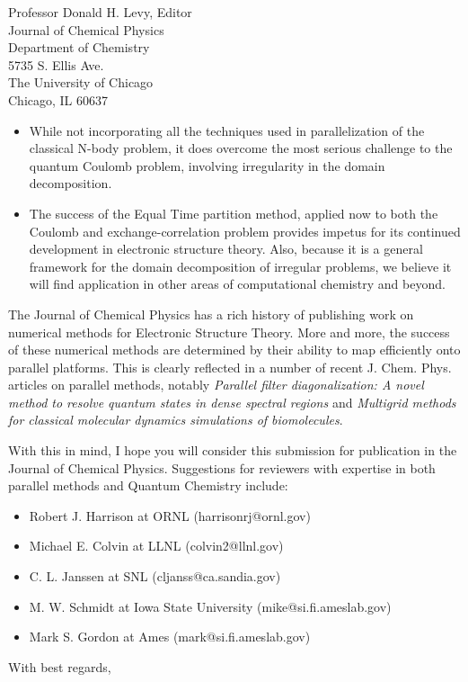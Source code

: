 \begin{letter}{
Professor Donald H. Levy, Editor\\
Journal of Chemical Physics\\
Department of Chemistry\\
5735 S. Ellis Ave.\\
The University of Chicago\\
Chicago, IL 60637}
\begin{itemize}
\item  While not incorporating all the techniques used in parallelization
       of the classical N-body problem, it does overcome the most
       serious challenge to the quantum Coulomb problem, involving 
       irregularity in the domain decomposition. 
  
\item  The success of the Equal Time partition method, applied now to 
       both the Coulomb and exchange-correlation problem provides
       impetus for its continued development in electronic structure
       theory.  Also, because it is a general framework for the domain
       decomposition of irregular problems, we believe it will find
       application in other areas of computational chemistry and
       beyond. 

\end{itemize}

The Journal of Chemical Physics has a rich history of publishing work
on numerical methods for Electronic Structure Theory.  More and more,
the success of these numerical methods are determined by their ability
to map efficiently onto parallel platforms.  This is clearly reflected
in a number of recent J. Chem. Phys. articles on parallel methods, notably {\em
Parallel filter diagonalization: A novel method to resolve quantum
states in dense spectral regions} and {\em Multigrid methods for
classical molecular dynamics simulations of biomolecules}.

With this in mind, I hope you will consider this submission for
publication in the Journal of Chemical Physics.  Suggestions for
reviewers with expertise in both parallel methods and Quantum
Chemistry include: 

\begin{itemize}
\item Robert J. Harrison at ORNL (harrisonrj@ornl.gov)
\item Michael E. Colvin at LLNL (colvin2@llnl.gov)
\item C. L. Janssen at SNL (cljanss@ca.sandia.gov)
\item M. W. Schmidt at Iowa State University (mike@si.fi.ameslab.gov)
\item Mark S. Gordon at Ames (mark@si.fi.ameslab.gov)
\end{itemize}


\closing{With best regards,}
\end{letter}

